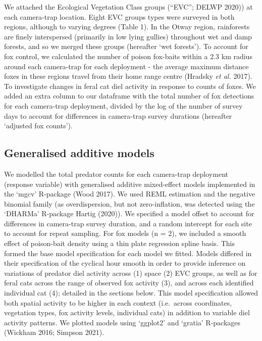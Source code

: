 \documentclass[11pt,a4paper,titlepage,twoside,openright]{style/unimelbthesis}
\begin{document}
\begin{mainmatter}
We attached the Ecological Vegetation Class groups (``EVC''; DELWP 2020)) at each camera-trap location. Eight EVC groups types were surveyed in both regions, although to varying degrees (Table 1). In the Otway region, rainforests are finely interspersed (primarily in low lying gullies) throughout wet and damp forests, and so we merged these groups (hereafter `wet forests'). To account for fox control, we calculated the number of poison fox-baits within a 2.3 km radius around each camera-trap for each deployment - the average maximum distance foxes in these regions travel from their home range centre (Hradsky \emph{et al.} 2017). To investigate changes in feral cat diel activity in response to counts of foxes. We added an extra column to our dataframe with the total number of fox detections for each camera-trap deployment, divided by the log of the number of survey days to account for differences in camera-trap survey durations (hereafter `adjusted fox counts').

\hypertarget{generalised-additive-models}{%
\subsection{Generalised additive models}\label{generalised-additive-models}}

We modelled the total predator counts for each camera-trap deployment (response variable) with generalised additive mixed-effect models implemented in the `mgcv' R-package (Wood 2017). We used REML estimation and the negative binomial family (as overdispersion, but not zero-inflation, was detected using the `DHARMa' R-package Hartig (2020)). We specified a model offset to account for differences in camera-trap survey duration, and a random intercept for each site to account for repeat sampling. For fox models (n = 2), we included a smooth effect of poison-bait density using a thin plate regression spline basis. This formed the base model specification for each model we fitted. Models differed in their specification of the cyclical hour smooth in order to provide inference on variations of predator diel activity across (1) space (2) EVC groups, as well as for feral cats across the range of observed fox activity (3), and across each identified individual cat (4); detailed in the sections below. This model specification allowed both spatial activity to be higher in each context (i.e.~across coordinates, vegetation types, fox activity levels, individual cats) in addition to variable diel activity patterns. We plotted models using `ggplot2' and `gratia' R-packages (Wickham 2016; Simpson 2021).


\end{mainmatter}
\end{document}
